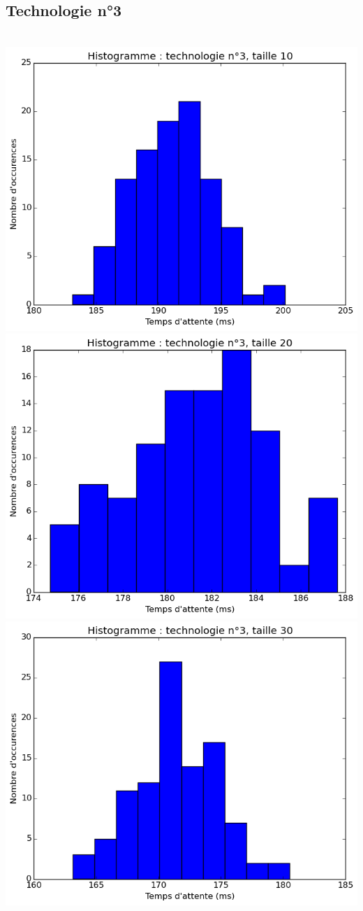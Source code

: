 \documentclass[a4paper,10pt]{article}
\begin{document}
\subsection{Technologie n°3}
\\
\includegraphics[scale=0.4]{img/3-10.png}
\includegraphics[scale=0.4]{img/3-20.png}
\\
\includegraphics[scale=0.4]{img/3-30.png}
\end{document}
